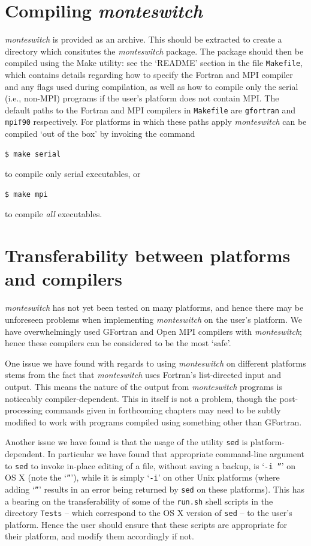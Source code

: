 \documentclass{report}
\begin{document}
\section{Compiling \emph{monteswitch}}
\emph{monteswitch} is provided as an archive. This should be extracted to create a directory which consitutes the \emph{monteswitch} package. The 
package should then be compiled using the Make utility: see the `README' section in the file \texttt{Makefile}, which contains details regarding how to
specify the Fortran and MPI compiler and any flags used during compilation, as well as how to compile only the serial (i.e., non-MPI) programs
if the user's platform does not contain MPI.
The default paths to the Fortran and MPI compilers in \texttt{Makefile} are \texttt{gfortran} and \texttt{mpif90} respectively. For platforms in which
these paths apply \emph{monteswitch} can be compiled `out of the box' by invoking the command 
\begin{verbatim}
$ make serial
\end{verbatim} 
to compile only serial executables, or 
\begin{verbatim}
$ make mpi
\end{verbatim}
to compile \emph{all} executables.


\section{Transferability between platforms and compilers}
\emph{monteswitch} has not yet been tested on many platforms, and hence there may be unforeseen problems when implementing \emph{monteswitch} on
the user's platform. We have overwhelmingly used GFortran and Open MPI compilers with \emph{monteswitch}; hence these compilers can be considered 
to be the most `safe'.

One issue we have found with regards to using \emph{monteswitch} on different platforms stems from the fact that \emph{monteswitch} uses Fortran's 
list-directed input and output. This means the nature of the output from \emph{monteswitch} programs is noticeably compiler-dependent. This in itself
is not a problem, though the post-processing commands given in forthcoming chapters may need to be subtly modified to work with programs compiled using 
something other than GFortran.

Another issue we have found is that the usage of the utility \texttt{sed} is platform-dependent. In particular we have found that appropriate command-line
argument to \texttt{sed} to invoke in-place editing of a file, without saving a backup, is `\texttt{-i ''}' on OS X (note the `\texttt{''}'), 
while it is simply `\texttt{-i}' on other Unix platforms (where adding `\texttt{''}' results in an error being returned by \texttt{sed} on these
platforms). This has a bearing on the transferability of some of the \texttt{run.sh} shell scripts in the directory \texttt{Tests} -- which correspond to the
OS X version of \texttt{sed} -- to the user's platform. Hence the user should ensure that these scripts are appropriate for their platform, and modify
them accordingly if not.
\end{document}
